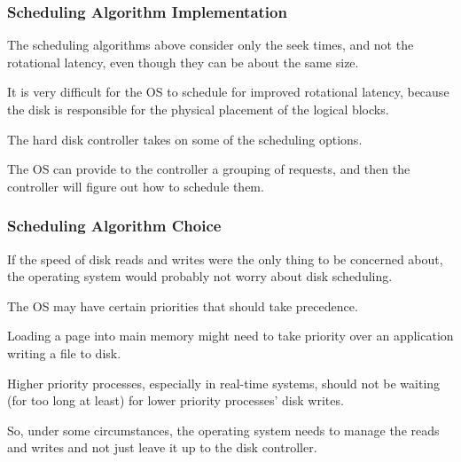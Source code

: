 \begin{frame}
\frametitle{Scheduling Algorithm Implementation}

The scheduling algorithms above consider only the seek times, and not the rotational latency, even though they can be about the same size. 

It is very difficult for the OS to schedule for improved rotational latency, because the disk is responsible for the physical placement of the logical blocks. 

The hard disk controller takes on some of the scheduling options. 

The OS can provide to the controller a grouping of requests, and then the controller will figure out how to schedule them.

\end{frame}

\begin{frame}
\frametitle{Scheduling Algorithm Choice}

If the speed of disk reads and writes were the only thing to be concerned about, the operating system would probably not worry about disk scheduling.

The OS may have certain priorities that should take precedence. 

Loading a page into main memory might need to take priority over an application writing a file to disk. 

Higher priority processes, especially in real-time systems, should not be waiting (for too long at least) for lower priority processes' disk writes. 

So, under some circumstances, the operating system needs to manage the reads and writes and not just leave it up to the disk controller.

\end{frame}



